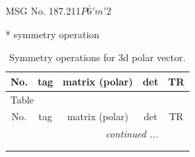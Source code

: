 \documentclass[fleqn,8pt]{jsarticle}
\begin{document}
\setcounter{MaxMatrixCols}{32}

\renewcommand{\tablename}{Table~}
\renewcommand{\figurename}{Figure~}
\begin{center}
\LARGE
MSG No. 187.211\quad$P\bar{6}'m'2$
\end{center}
* symmetry operation
\renewcommand{\arraystretch}{1.3}
\begin{longtable}{ccccc}
\caption{Symmetry operations for 3d polar vector.}
 \\
 \hline \hline
No. & tag & matrix (polar) & det & TR \\ \hline \endfirsthead

\multicolumn{4}{l}{\tablename\ \thetable{}} \\
 \hline \hline
No. & tag & matrix (polar) & det & TR \\ \hline \endhead

 \hline \hline
\multicolumn{4}{r}{\footnotesize\it continued ...} \\ \endfoot

 \hline \hline
\multicolumn{4}{r}{} \\ \endlastfoot


\end{longtable}
\end{document}

